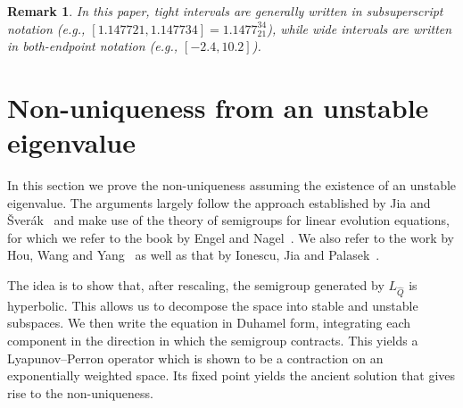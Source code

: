 \documentclass[11pt]{article}
\newtheorem{remark}[definition]{Remark}
\begin{document}
\begin{remark}
  In this paper, tight intervals are generally written in
  subsuperscript notation (e.g.,
  \([1.147721, 1.147734] = 1.1477_{21}^{34}\)), while wide intervals
  are written in both-endpoint notation (e.g.,
  \([-2.4, 10.2]\)).
\end{remark}

\section{Non-uniqueness from an unstable eigenvalue}
\label{sec:non-uniqueness-from-unstable-eigenvalue}

In this section we prove the non-uniqueness assuming the existence of
an unstable eigenvalue. The arguments largely follow the approach
established by Jia and Šverák~\cite{Jia2015} and make use of the
theory of semigroups for linear evolution equations, for which we
refer to the book by Engel and Nagel~\cite{Engel2000}. We also refer
to the work by Hou, Wang and Yang~\cite{Hou2025} as well as that by
Ionescu, Jia and Palasek~\cite{Ionescu2026}.

The idea is to show that, after rescaling, the semigroup generated by
\(L_{\hat{Q}}\) is hyperbolic. This allows us to decompose the space
into stable and unstable subspaces. We then write the equation in
Duhamel form, integrating each component in the direction in which the
semigroup contracts. This yields a Lyapunov--Perron operator which is
shown to be a contraction on an exponentially weighted space. Its
fixed point yields the ancient solution that gives rise to the
non-uniqueness.
\end{document}
